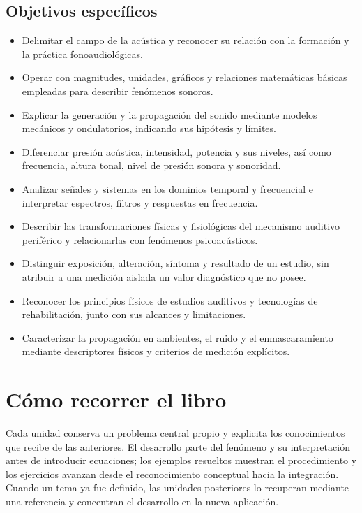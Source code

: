 \subsection*{Objetivos específicos}

\begin{itemize}
    \item Delimitar el campo de la acústica y reconocer su relación con la
    formación y la práctica fonoaudiológicas.
    \item Operar con magnitudes, unidades, gráficos y relaciones matemáticas
    básicas empleadas para describir fenómenos sonoros.
    \item Explicar la generación y la propagación del sonido mediante modelos
    mecánicos y ondulatorios, indicando sus hipótesis y límites.
    \item Diferenciar presión acústica, intensidad, potencia y sus niveles, así
    como frecuencia, altura tonal, nivel de presión sonora y sonoridad.
    \item Analizar señales y sistemas en los dominios temporal y frecuencial e
    interpretar espectros, filtros y respuestas en frecuencia.
    \item Describir las transformaciones físicas y fisiológicas del mecanismo
    auditivo periférico y relacionarlas con fenómenos psicoacústicos.
    \item Distinguir exposición, alteración, síntoma y resultado de un estudio,
    sin atribuir a una medición aislada un valor diagnóstico que no posee.
    \item Reconocer los principios físicos de estudios auditivos y
    tecnologías de rehabilitación, junto con sus alcances y limitaciones.
    \item Caracterizar la propagación en ambientes, el ruido y el
    enmascaramiento mediante descriptores físicos y criterios de medición
    explícitos.
\end{itemize}

\section*{Cómo recorrer el libro}

Cada unidad conserva un problema central propio y explicita los conocimientos
que recibe de las anteriores. El desarrollo parte del fenómeno y su
interpretación antes de introducir ecuaciones; los ejemplos resueltos muestran
el procedimiento y los ejercicios avanzan desde el reconocimiento conceptual
hacia la integración. Cuando un tema ya fue definido, las unidades posteriores
lo recuperan mediante una referencia y concentran el desarrollo en la nueva
aplicación.


